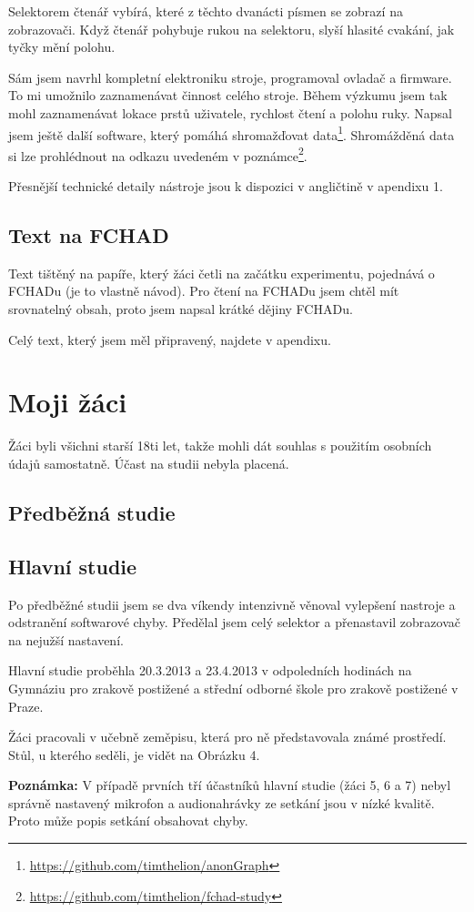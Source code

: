 Selektorem čtenář vybírá, které z těchto dvanácti písmen se zobrazí na zobrazovači. Když čtenář pohybuje rukou na selektoru, slyší hlasité cvakání, jak tyčky mění polohu.

Sám jsem navrhl kompletní elektroniku stroje, programoval ovladač a firmware. To mi umožnilo zaznamenávat činnost celého stroje.  Během výzkumu jsem tak mohl zaznamenávat lokace prstů uživatele, rychlost čtení a polohu ruky.  Napsal jsem ještě další software, který pomáhá shromažďovat data\footnote{\url{https://github.com/timthelion/anonGraph}}.  Shromážděná data si lze prohlédnout na odkazu uvedeném v poznámce\footnote{\url{https://github.com/timthelion/fchad-study}}.

Přesnější technické detaily nástroje jsou k dispozici v angličtině v apendixu 1.

\subsection{Text na FCHAD}
Text tištěný na papíře, který žáci četli na začátku experimentu, pojednává o FCHADu (je to vlastně návod). Pro čtení na FCHADu jsem chtěl mít srovnatelný obsah, proto jsem napsal krátké dějiny FCHADu.

Celý text, který jsem měl připravený, najdete v apendixu.

\section{Moji žáci}

Žáci byli všichni starší 18ti let, takže mohli dát souhlas s použitím osobních údajů samostatně.  Účast na studii nebyla placená.

\subsection{Předběžná studie}





\subsection{Hlavní studie}

Po předběžné studii jsem se dva víkendy intenzivně věnoval vylepšení nastroje a odstranění softwarové chyby.  Předělal jsem celý selektor a přenastavil zobrazovač na nejužší nastavení.

Hlavní studie proběhla 20.3.2013 a 23.4.2013 v odpoledních hodinách na Gymnáziu pro zrakově postižené a střední odborné škole pro zrakově postižené v Praze.

Žáci pracovali v učebně zeměpisu, která pro ně představovala známé prostředí.  Stůl, u kterého seděli, je vidět na Obrázku 4.

{\bf Poznámka:}  V případě prvních tří účastníků hlavní studie (žáci 5, 6 a 7) nebyl správně nastavený mikrofon a audionahrávky ze setkání jsou v nízké kvalitě.  Proto může popis setkání obsahovat chyby.






